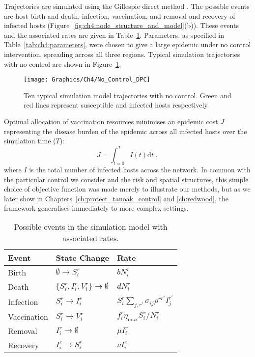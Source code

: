 Trajectories are simulated using the Gillespie direct method \citep{gillespie_exact_1977}. The possible events are host birth and death, infection, vaccination, and removal and recovery of infected hosts (Figure~\ref{fig:ch4:node_structure_and_model}(b)). These events and the associated rates are given in Table~\ref{tab:ch4:rates}. Parameters, as specified in Table~\ref{tab:ch4:parameters}, were chosen to give a large epidemic under no control intervention, spreading across all three regions. Typical simulation trajectories with no control are shown in Figure~\ref{fig:ch4:no_control_dpc}.

\begin{figure}[htb]
    \begin{center}
        \texttt{[image: Graphics/Ch4/No\_Control\_DPC]}
        \caption[Uncontrolled network model dynamics]{Ten typical simulation model trajectories with no control. Green and red lines represent susceptible and infected hosts respectively.\label{fig:ch4:no_control_dpc}}
    \end{center}
\end{figure}

Optimal allocation of vaccination resources minimises an epidemic cost $J$ representing the disease burden of the epidemic across all infected hosts over the simulation time ($T$):
\begin{equation}
    J = \int_{t=0}^TI(t)\mathrm{d}t\;,
\end{equation}
where $I$ is the total number of infected hosts across the network. In common with the particular control we consider and the risk and spatial structures, this simple choice of objective function was made merely to illustrate our methods, but as we later show in Chapters~\ref{ch:protect_tanoak_control} and \ref{ch:redwood}, the framework generalises immediately to more complex settings.

\begin{table}
    \centering
    \caption[Possible events in the simulation model]{Possible events in the simulation model with associated rates.\label{tab:ch4:rates}}
    \begin{tabular}{@{}lll@{}}
        \toprule
        \textbf{Event} & \textbf{State Change} & \textbf{Rate} \\
        \midrule
        Birth & $\emptyset \rightarrow S_i^r$ & $bN_i^r$\\
        Death & $\{S_i^r,I_i^r,V_i^r\} \rightarrow \emptyset$ & $dN_i^r$ \\
        Infection & $S_i^r \rightarrow I_i^r$ & $S_i^r\sum_{j,r'}\sigma_{ij}\rho^{rr'}I_j^{r'}$\\
        Vaccination & $S_i^r \rightarrow V_i^r$ & $f_i^r\eta_{\textrm{max}}S_i^r / N_i^r$\\
        Removal & $I_i^r \rightarrow \emptyset$ & $\mu{}I_i^r$\\
        Recovery & $I_i^r \rightarrow S_i^r$ & $\nu{}I_i^r$\\
        \bottomrule
    \end{tabular}
\end{table}
        
